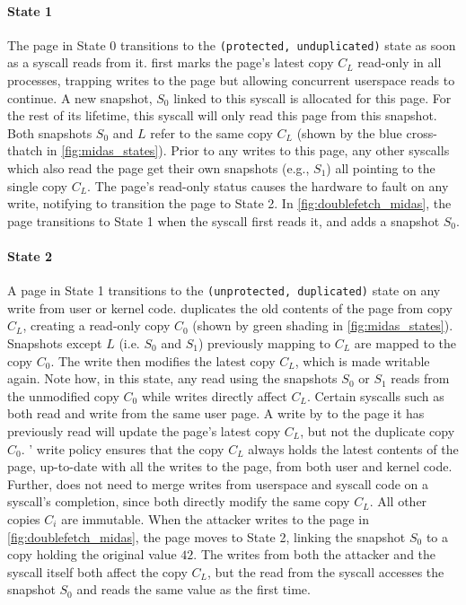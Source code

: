 \paragraph{State 1}
The page in State 0 transitions to the \texttt{(protected, unduplicated)} state as soon as a syscall
reads from it.
\midas first marks the page's latest copy $C_L$ read-only in all processes,
trapping writes to the page but allowing concurrent userspace reads to continue.
A new snapshot, $S_0$ linked to this syscall is allocated for this page.
For the rest of its lifetime, this syscall will only read this page from this snapshot.
Both snapshots $S_0$ and $L$ refer to the same copy $C_L$ (shown by the
blue cross-thatch in \autoref{fig:midas_states}).
Prior to any writes to this page, any other syscalls which also read the page
get their own snapshots (e.g., $S_1$) all pointing to the single copy $C_L$.
The page's read-only status causes the hardware to fault on any write,
notifying \midas to transition the page to State 2.
In \autoref{fig:doublefetch_midas}, the page transitions to State 1 when
the syscall first reads it, and adds a snapshot $S_0$.

\paragraph{State 2}
A page in State 1 transitions to the \texttt{(unprotected, duplicated)} state
on any write from user or kernel code.
\midas duplicates the old contents of the page from copy $C_L$, creating a
read-only copy $C_0$ (shown by green shading in \autoref{fig:midas_states}).
Snapshots except $L$ (i.e. $S_0$ and $S_1$) previously mapping to $C_L$ are
mapped to the copy $C_0$.
The write then modifies the latest copy $C_L$, which is made writable again.
Note how, in this state, any read using the snapshots $S_0$ or $S_1$ reads
from the unmodified copy $C_0$ while writes directly affect $C_L$.
Certain syscalls such as  both read and write from
the same user page.
A write by  to the page it has previously read will update
the page's latest copy $C_L$, but not the duplicate copy $C_0$.
\midas' write policy ensures that the copy $C_L$ always holds the latest
contents of the page, up-to-date with all the writes to the page, from both user
and kernel code.
Further, \midas does not need to merge writes from userspace and syscall code
on a syscall's completion, since both directly modify the same copy $C_L$.
All other copies $C_i$ are immutable.
When the attacker writes to the page in \autoref{fig:doublefetch_midas}, the
page moves to State 2, linking the snapshot $S_0$ to a copy holding the
original value $42$.
The writes from both the attacker and the syscall itself both affect
the copy $C_L$, but the read from the syscall accesses the snapshot $S_0$
and reads the same value as the first time.


